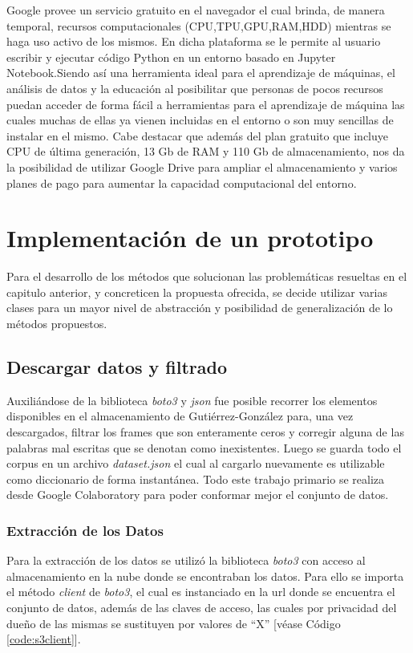 Google provee un servicio gratuito en el navegador el cual brinda, de manera temporal, recursos computacionales (CPU,TPU,GPU,RAM,HDD) mientras se haga uso activo de los mismos. En dicha plataforma se le permite al usuario escribir y ejecutar código Python en un entorno basado en Jupyter Notebook.Siendo así una herramienta ideal para el aprendizaje de máquinas, el análisis de datos y la educación al posibilitar que personas de pocos recursos puedan acceder de forma fácil a herramientas para el aprendizaje de máquina las cuales muchas de ellas ya vienen incluidas en el entorno o son muy  sencillas de instalar en el mismo.
Cabe destacar que además del plan gratuito que incluye CPU de última generación, 13 Gb de RAM y 110 Gb de almacenamiento, nos da la posibilidad de utilizar Google Drive para ampliar el almacenamiento y  varios planes de pago para aumentar la capacidad computacional del entorno.


\section{Implementación de un prototipo}
Para el desarrollo de los métodos que solucionan las problemáticas resueltas en el capitulo anterior, y concreticen la propuesta ofrecida, se decide utilizar varias clases para un mayor nivel de abstracción y posibilidad de generalización de lo métodos propuestos.

\subsection{Descargar datos y filtrado}
Auxiliándose de la biblioteca \textit{boto3} y \textit{json} fue posible recorrer los elementos disponibles en el almacenamiento de Gutiérrez-González para, una vez descargados, filtrar los frames que son enteramente ceros y corregir alguna de las palabras mal escritas que se denotan como inexistentes. Luego se guarda todo el corpus en un archivo \textit{dataset.json} el cual al cargarlo nuevamente es utilizable como diccionario de forma instantánea. Todo este trabajo primario se realiza desde Google Colaboratory para poder conformar mejor el conjunto de datos.

\subsubsection{Extracción de los Datos}
Para la extracción de los datos se utilizó la biblioteca \textit{boto3} con acceso al almacenamiento en la nube donde se encontraban los datos.
Para ello se importa el método \textit{client} de \textit{boto3}, el cual es instanciado en la url donde se encuentra el conjunto de datos, además de las claves de acceso, las cuales por privacidad del dueño de las mismas se sustituyen por valores de ``X'' [véase Código \ref{code:s3client}]. 

